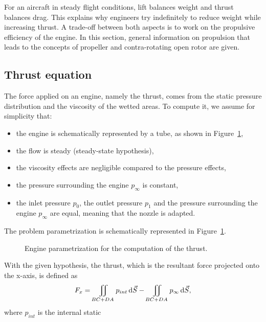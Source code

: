 
For an aircraft in steady flight conditions, 
lift balances weight and 
thrust balances drag. This explains why engineers try
indefinitely to reduce weight while increasing
thrust. A trade-off between both aspects is to work
on the propulsive efficiency of the engine. In this
section, general information on propulsion
that leads to the concepts of propeller and
contra-rotating open rotor are given.

\subsection{Thrust equation}
\label{sub:cror_thrust}

The force applied on an engine, namely the thrust,
comes from the static pressure
distribution and the viscosity of the wetted areas.
To compute it, we assume for simplicity that:
 \begin{itemize} \itemsep0pt \parskip0pt
  \item the engine is schematically represented by a tube,
  as shown in Figure~\ref{fig:engine_parametrization},
  \item the flow is steady (steady-state hypothesis),
  \item the viscosity effects are negligible compared
  to the pressure effects,
  \item the pressure surrounding the engine $p_\infty$
  is constant,
  \item the inlet pressure $p_0$, the outlet pressure
  $p_1$ and the pressure surrounding the engine $p_\infty$ are equal,
  meaning that the nozzle is adapted.
\end{itemize}
The problem parametrization is schematically represented
in Figure~\ref{fig:engine_parametrization}.
\begin{figure}[htp]
  \centering
  \quad{}
  \caption{Engine parametrization for the computation of the thrust.}
  \label{fig:engine_parametrization}
\end{figure}
With the given hypothesis, the thrust, which is
the resultant force
projected onto the x-axis, is defined as
\begin{equation}
	F_x = \iint_{BC + DA} p_{int} \diff \vec{S} - 
	    \iint_{BC + DA} p_{\infty} \diff \vec{S},
	\label{eq:thrust_1}
\end{equation}
where $p_{int}$ is the internal static
